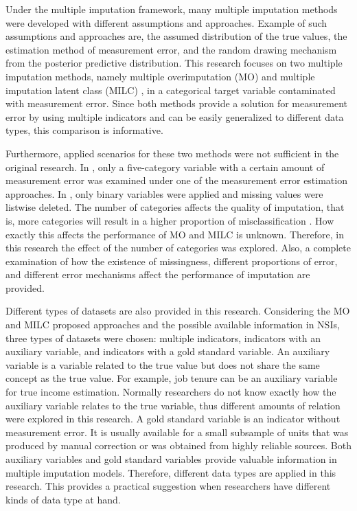 \documentclass[oneside,a4paper]{article}
\begin{document}
Under the multiple imputation framework, many multiple imputation methods were developed with different assumptions and approaches. Example of such assumptions and approaches are, the assumed distribution of the true values, the estimation method of measurement error, and the random drawing mechanism from the posterior predictive distribution. This research focuses on two multiple imputation methods, namely multiple overimputation (MO) \cite{MO2, MO1} and multiple imputation latent class (MILC) \cite{MILC}, in a categorical target variable contaminated with measurement error. Since both methods provide a solution for measurement error by using multiple indicators and can be easily generalized to different data types, this comparison is informative.

Furthermore, applied scenarios for these two methods were not sufficient in the original research. In , only a five-category variable with a certain amount of measurement error was examined under one of the measurement error estimation approaches. In , only binary variables were applied and missing values were listwise deleted. The number of categories affects the quality of imputation, that is, more categories will result in a higher proportion of misclassification \cite{Kropko}. How exactly this affects the performance of MO and MILC is unknown. Therefore, in this research the effect of the number of categories was explored. Also, a complete examination of how the existence of missingness, different proportions of error, and different error mechanisms affect the performance of imputation are provided.

Different types of datasets are also provided in this research. Considering the MO and MILC proposed approaches and the possible available information in NSIs, three types of datasets were chosen: multiple indicators, indicators with an auxiliary variable, and indicators with a gold standard variable. An auxiliary variable is a variable related to the true value but does not share the same concept as the true value. For example, job tenure can be an auxiliary variable for true income estimation. Normally researchers do not know exactly how the auxiliary variable relates to the true variable, thus different amounts of relation were explored in this research. A gold standard variable is an indicator without measurement error. It is usually available for a small subsample of units that was produced by manual correction or was obtained from highly reliable sources. Both auxiliary variables and gold standard variables provide valuable information in multiple imputation models. Therefore, different data types are applied in this research. This provides a practical suggestion when researchers have different kinds of data type at hand. 
 
\end{document}
